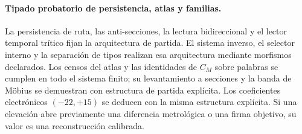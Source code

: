 \enlargethispage{6\baselineskip}
\paragraph{Tipado probatorio de persistencia, atlas y familias.}
La persistencia de ruta, las anti-secciones, la lectura bidireccional y el
lector temporal tr\'itico fijan la arquitectura de partida. El sistema
inverso, el selector interno y la separaci\'on de tipos realizan esa
arquitectura mediante morfismos declarados. Los censos del atlas y las
identidades de \(C_M\) sobre palabras se cumplen en todo el sistema finito;
su levantamiento a secciones y la banda de M\"obius se demuestran con
estructura de partida expl\'icita. Los coeficientes electr\'onicos
\((-22,+15)\) se deducen con la misma estructura expl\'icita. Si una
elevaci\'on abre previamente una diferencia metrol\'ogica o una firma objetivo,
su valor es una reconstrucci\'on calibrada.
